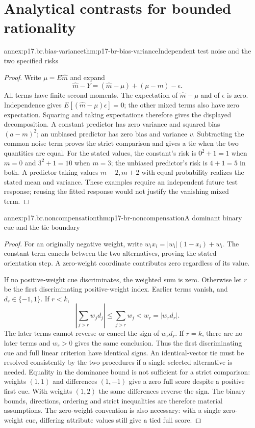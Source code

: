 \section{Analytical contrasts for bounded rationality}
\label{sec:annex-p17-rationality-8-5}

\begin{annexitem}{annex:p17.br.bias-variance}{thm:p17-br-bias-variance}{Independent test noise and the two specified risks}
\begin{proof}
Write \(\mu=E\widehat m\) and expand
\[
 \widehat m-Y=(\widehat m-\mu)+(\mu-m)-\epsilon.
\]
All terms have finite second moments. The expectation of
\(\widehat m-\mu\) and of \(\epsilon\) is zero. Independence
gives \(E[(\widehat m-\mu)\epsilon]=0\); the other mixed terms
also have zero expectation. Squaring and taking expectations therefore
gives the displayed decomposition. A constant predictor has zero variance
and squared bias \((a-m)^2\); an unbiased predictor has zero bias
and variance \(v\). Subtracting the common noise term proves the
strict comparison and gives a tie when the two quantities are equal.
For the stated values, the constant's risk is \(0^2+1=1\) when
\(m=0\) and \(3^2+1=10\) when \(m=3\); the unbiased
predictor's risk is \(4+1=5\) in both. A predictor taking values
\(m-2,m+2\) with equal probability realizes the stated mean and
variance. These examples require an independent future test response;
reusing the fitted response would not justify the vanishing mixed term.
\end{proof}
\end{annexitem}

\begin{annexitem}{annex:p17.br.noncompensation}{thm:p17-br-noncompensation}{A dominant binary cue and the tie boundary}
\begin{proof}
For an originally negative weight, write
\(w_ix_i=|w_i|(1-x_i)+w_i\). The constant term cancels between
the two alternatives, proving the stated orientation step. A
zero-weight coordinate contributes zero regardless of its value.

If no positive-weight cue discriminates, the weighted sum is zero.
Otherwise let \(r\) be the first discriminating positive-weight index.
Earlier terms vanish, and
\(d_r\in\{-1,1\}\). If \(r<k\),
\[
 \left|\sum_{j>r}w_jd_j\right|
          \leq\sum_{j>r}w_j<w_r=|w_rd_r|.
\]
The later terms cannot reverse or cancel the sign of \(w_rd_r\).
If \(r=k\), there are no later terms and \(w_r>0\) gives the
same conclusion. Thus the first discriminating cue and full linear
criterion have identical signs. An identical-vector tie must be resolved
consistently by the two procedures if a single selected alternative is
needed. Equality in the dominance bound is not sufficient for a strict
comparison: weights \((1,1)\) and differences \((1,-1)\) give a
zero full score despite a positive first cue. With weights \((1,2)\)
the same differences reverse the sign. The binary bounds, directions,
ordering and strict inequalities are therefore material assumptions.
The zero-weight convention is also necessary: with a single zero-weight
cue, differing attribute values still give a tied full score.
\end{proof}
\end{annexitem}

